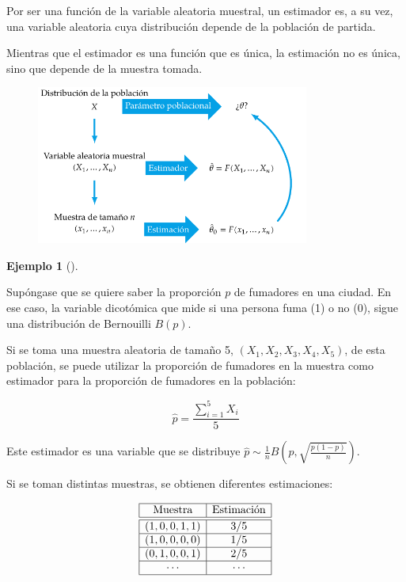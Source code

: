 \documentclass[
  a4paper,
]{scrreport}
\theoremstyle{definition}
\theoremstyle{definition}
\newtheorem{example}{Ejemplo}[chapter]
\theoremstyle{plain}
\theoremstyle{remark}
\begin{document}
Por ser una función de la variable aleatoria muestral, un estimador es,
a su vez, una variable aleatoria cuya distribución depende de la
población de partida.

Mientras que el estimador es una función que es única, la estimación no
es única, sino que depende de la muestra tomada.

\begin{figure}

{\centering \includegraphics[width=0.8\textwidth,height=\textheight]{img/estimacion/estimador-estimacion.pdf}

}

\end{figure}

\begin{example}[]\protect\hypertarget{exm-estimacion-fumadores}{}\label{exm-estimacion-fumadores}

Supóngase que se quiere saber la proporción \(p\) de fumadores en una
ciudad. En ese caso, la variable dicotómica que mide si una persona fuma
(1) o no (0), sigue una distribución de Bernouilli \(B(p)\).

Si se toma una muestra aleatoria de tamaño 5, \((X_1,X_2,X_3,X_4,X_5)\),
de esta población, se puede utilizar la proporción de fumadores en la
muestra como estimador para la proporción de fumadores en la población:

\[
\hat p = \frac{\sum_{i=1}^5 X_i}{5}
\]

Este estimador es una variable que se distribuye
\(\hat p\sim \frac{1}{n}B\left(p,\sqrt{\frac{p(1-p)}{n}}\right)\).

Si se toman distintas muestras, se obtienen diferentes estimaciones:

\[
\begin{array}{|c|c|}
\hline
\mbox{Muestra} & \mbox{Estimación}\\
\hline\hline
(1, 0, 0, 1, 1) & 3/5\\
\hline
(1, 0, 0, 0, 0) & 1/5\\
\hline
(0, 1, 0, 0, 1) & 2/5\\
\hline
\cdots & \cdots\\
\hline
\end{array}
\]

\end{example}
\end{document}
